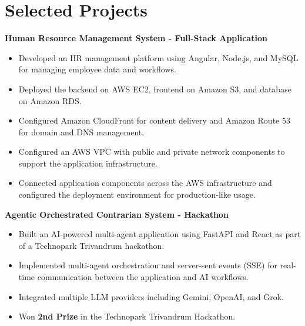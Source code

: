 \documentclass[10pt,a4paper]{article}
\begin{document}
\section*{Selected Projects}

\textbf{Human Resource Management System - Full-Stack Application}

\begin{itemize}
    \item Developed an HR management platform using Angular, Node.js, and MySQL for managing employee data and workflows.
    
    \item Deployed the backend on AWS EC2, frontend on Amazon S3, and database on Amazon RDS.
    
    \item Configured Amazon CloudFront for content delivery and Amazon Route 53 for domain and DNS management.
    
    \item Configured an AWS VPC with public and private network components to support the application infrastructure.
    
    \item Connected application components across the AWS infrastructure and configured the deployment environment for production-like usage.
\end{itemize}

\textbf{Agentic Orchestrated Contrarian System - Hackathon}

\begin{itemize}
    \item Built an AI-powered multi-agent application using FastAPI and React as part of a Technopark Trivandrum hackathon.
    
    \item Implemented multi-agent orchestration and server-sent events (SSE) for real-time communication between the application and AI workflows.
    
    \item Integrated multiple LLM providers including Gemini, OpenAI, and Grok.
    
    \item Won \textbf{2nd Prize} in the Technopark Trivandrum Hackathon.
\end{itemize}

\end{document}
